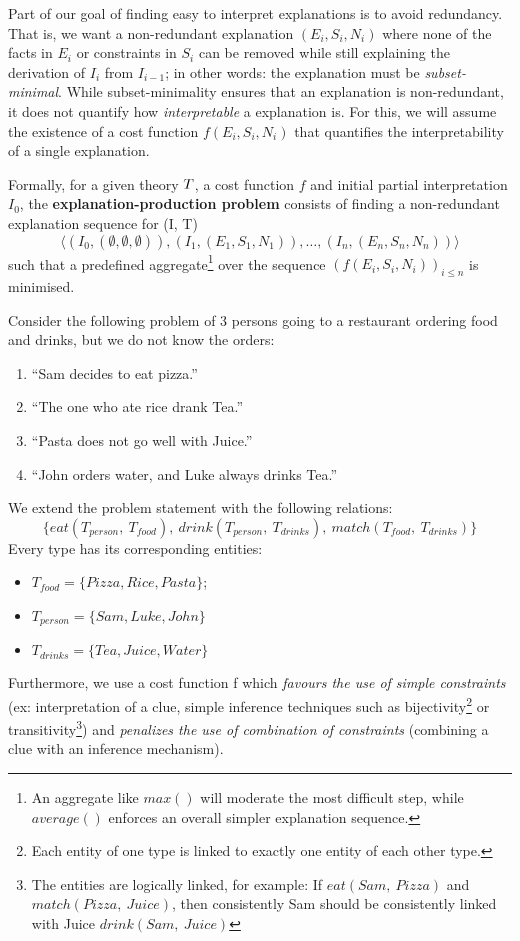Part of our goal of finding easy to interpret explanations is to avoid redundancy.
That is, we want a non-redundant explanation $(E_i,S_i,N_i)$ where none of the facts in $E_i$ or constraints in $S_i$ can be removed while still explaining the derivation of $I_i$ from $I_{i-1}$; in other words: the explanation must be \textit{subset-minimal}.
While subset-minimality ensures that an explanation is non-redundant, it does not quantify how \textit{interpretable} a explanation is.
For this, we will assume the existence of a cost function $f(E_i,S_i,N_i)$ that quantifies the interpretability of a single explanation.

Formally, for a given theory $T$, a cost function $f$ and initial partial interpretation $I_0$, the \textbf{explanation-production problem} consists of finding a non-redundant explanation sequence for (I, T)
\[\langle(I_0,(\emptyset,\emptyset,\emptyset)), (I_1,(E_1,S_1,N_1)), \dots ,(I_n,(E_n,S_n,N_n))\rangle\]
such that a predefined aggregate\footnote{An aggregate like $max()$ will moderate the most difficult step, while $average()$ enforces an overall simpler explanation sequence.} over the sequence $\left(f(E_i,S_i,N_i)\right)_{i\leq n}$ is minimised.

Consider the following problem of 3 persons going to a restaurant ordering food and drinks, but we do not know the orders:
\begin{enumerate}
   \item ``Sam decides to eat pizza.''
   \item ``The one who ate rice drank Tea.''
   \item ``Pasta does not go well with Juice.''
   \item ``John orders water, and Luke always drinks Tea.''
\end{enumerate}  

\noindent We extend the problem statement with the following relations: $$\{ eat(T_{person},\ T_{food}), \ drink(T_{person},\  T_{drinks}),\  match(T_{food},\ T_{drinks})\}$$ 
\newpage \noindent Every type has its corresponding entities: 
\begin{itemize}
   \item $T_{food}= \{Pizza,  Rice,  Pasta\}$;
   \item $T_{person}= \{ Sam, Luke,John\}$
   \item $T_{drinks}= \{ Tea,  Juice,  Water\}$
\end{itemize}
Furthermore, we use a cost function f which \textit{favours the use of simple constraints} (ex: interpretation of a clue, simple inference techniques such as bijectivity\footnote{Each entity of one type is linked to exactly one entity of each other type.} or transitivity\footnote{The entities are logically linked, for example: If $eat(Sam,\ Pizza)$ and $match(Pizza,\ Juice)$, then consistently Sam should be consistently linked with Juice $drink(Sam,\ Juice)$}) and \textit{penalizes the use of combination of constraints} (combining a clue with an inference mechanism). 

